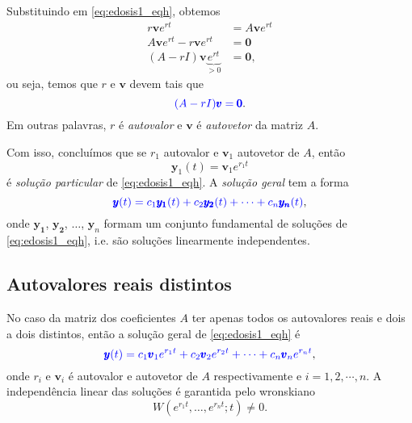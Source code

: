 Substituindo em \eqref{eq:edosis1_eqh}, obtemos
\begin{align}
  r\pmb{v}e^{rt} &= A\pmb{v}e^{rt} \\
  A\pmb{v}e^{rt} - r\pmb{v}e^{rt} &= \pmb{0} \\
  (A - rI)\pmb{v}\underbrace{e^{rt}}_{>0} &= \pmb{0},
\end{align}
ou seja, temos que $r$ e $\pmb{v}$ devem tais que
\begin{equation}\label{eq:edosis1_eqc}
  {\color{blue}(A - rI)\pmb{v} = \pmb{0}}.
\end{equation}
Em outras palavras, $r$ é \emph{autovalor} e $\pmb{v}$ é \emph{autovetor} da matriz $A$.

Com isso, concluímos que se $r_1$ autovalor e $\pmb{v}_1$ autovetor de $A$, então
\begin{equation}
  \pmb{y}_1(t) = \pmb{v}_1e^{r_1t}
\end{equation}
é \emph{solução particular} de \eqref{eq:edosis1_eqh}. A \emph{solução geral} tem a forma
\begin{equation}
  {\color{blue}\pmb{y}(t) = c_1\pmb{y_1}(t) + c_2\pmb{y_2}(t) + \cdots + c_n\pmb{y_n}(t)},
\end{equation}
onde $\pmb{y_1}$, $\pmb{y_2}$, $\dotsc$, $\pmb{y}_n$ formam um conjunto fundamental de soluções de \eqref{eq:edosis1_eqh}, i.e. são soluções linearmente independentes.

\subsection{Autovalores reais distintos}

No caso da matriz dos coeficientes $A$ ter apenas todos os autovalores reais e dois a dois distintos, então a solução geral de \eqref{eq:edosis1_eqh} é
\begin{equation}
  {\color{blue}\pmb{y}(t) = c_1\pmb{v}_1e^{r_1t}+c_2\pmb{v}_2e^{r_2t}+\cdots + c_n\pmb{v}_ne^{r_nt}},
\end{equation}
onde $r_i$ e $\pmb{v}_i$ é autovalor e autovetor de $A$ respectivamente e $i=1, 2, \cdots, n$. A independência linear das soluções é garantida pelo wronskiano
\begin{equation}
  W(e^{r_1t}, \dotsc, e^{r_nt};t)\neq 0.
\end{equation}

